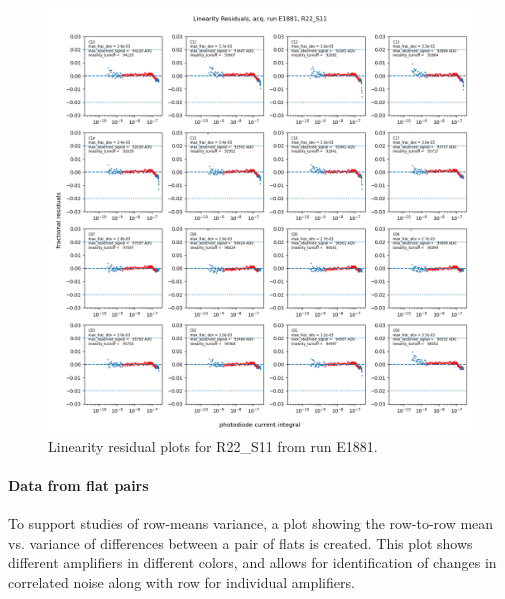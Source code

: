 \begin{figure}
    \centering
    \includegraphics[width=0.8\linewidth]{figures/ReferenceFigures/linearity_residuals_plot_LSSTCam_R22_S11_u_lsstccs_eo_linearity_plots_E1881_w_2024_35_20241105T131453Z.png}
    \caption{Linearity residual plots for R22\_S11 from run E1881.}
    \label{fig:ref:linearityResids}
\end{figure}

\clearpage
\paragraph{Data from flat pairs}

To support studies of row-means variance, a plot showing the row-to-row mean vs. variance of differences between a pair of flats is created. This plot shows different amplifiers in different colors, and allows for identification of changes in correlated noise along with row for individual amplifiers.

